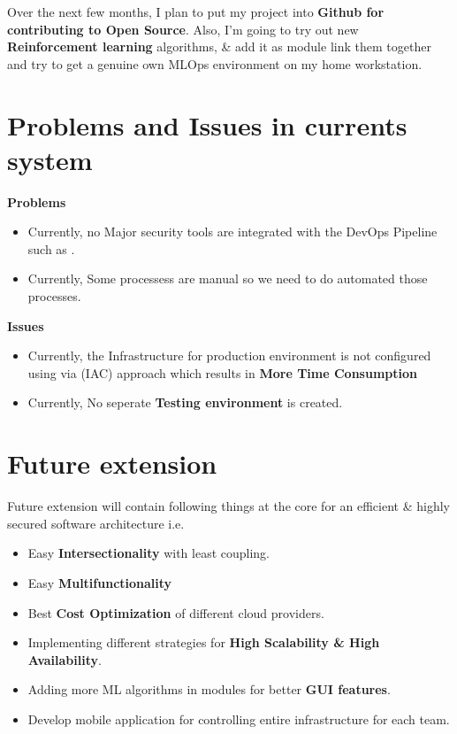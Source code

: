 \documentclass[12pt,oneside,a4paper]{report}
\begin{document}
Over the next few months, I plan to put my project into \textbf{Github for contributing to Open Source}. Also, I’m going to try out new \textbf{Reinforcement learning} algorithms, \& add it as module link them together and try to get a genuine own MLOps environment on my home workstation. 
\section{Problems and Issues in currents system}
\large{\textbf{Problems}}
\fontsize{12pt}{10pt}\selectfont
\begin{itemize}
\item Currently, no Major security tools are integrated with the DevOps Pipeline such as .
\item Currently, Some processess are manual so we need to do automated those processes.
\end{itemize}
\large{\textbf{Issues}}
\fontsize{12pt}{10pt}\selectfont
\begin{itemize}
\item Currently, the Infrastructure for production environment is not configured using via (IAC) approach which results in \textbf{More Time Consumption}
\item Currently, No seperate \textbf{Testing environment} is created. 
\end{itemize}

\newpage
\section{Future extension}
\fontsize{12pt}{10pt}\selectfont
Future extension will contain following things at the core for an efficient \& highly secured software architecture i.e.
\begin{itemize}
\item Easy \textbf{Intersectionality} with least coupling.
\item Easy \textbf{Multifunctionality} 
\item Best \textbf{Cost Optimization} of different cloud providers.
\item Implementing different strategies for \textbf{High Scalability \& High Availability}.
\item Adding more ML algorithms in modules for better \textbf{GUI features}.
\item Develop mobile application for controlling entire infrastructure for each team.
\end{itemize} 
\end{document}

